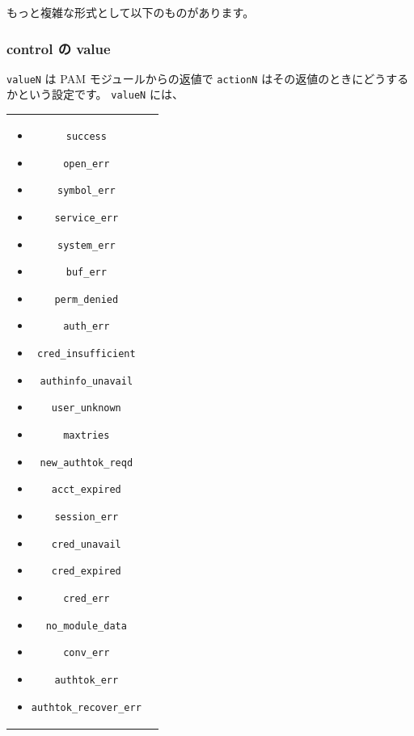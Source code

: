 \documentclass[mingoth,a4paper]{jsarticle}
\begin{document}
もっと複雑な形式として以下のものがあります。


\begin{commandline}
[value1=action1 value2=action2 ...]
\end{commandline}
\subsubsection{control の value}
\label{sec-1-4-4}

\verb~valueN~ は PAM モジュールからの返値で \verb~actionN~ はその返値のときにどうするかという設定です。
\verb~valueN~ には、

{\scriptsize
\begin{tabular}{cc}
  \begin{minipage}[b]{0.3\textwidth}
    \begin{itemize}
    \item \verb~success~
    \item \verb~open_err~
    \item \verb~symbol_err~
    \item \verb~service_err~
    \item \verb~system_err~
    \item \verb~buf_err~
    \item \verb~perm_denied~
    \item \verb~auth_err~
    \item \verb~cred_insufficient~
    \item \verb~authinfo_unavail~
    \item \verb~user_unknown~
    \end{itemize}
  \end{minipage}
  \begin{minipage}[b]{0.3\textwidth}
    \begin{itemize}
    \item \verb~maxtries~
    \item \verb~new_authtok_reqd~
    \item \verb~acct_expired~
    \item \verb~session_err~
    \item \verb~cred_unavail~
    \item \verb~cred_expired~
    \item \verb~cred_err~
    \item \verb~no_module_data~
    \item \verb~conv_err~
    \item \verb~authtok_err~
    \item \verb~authtok_recover_err~

\end{itemize}
\end{minipage}
\end{tabular}}
\end{document}
